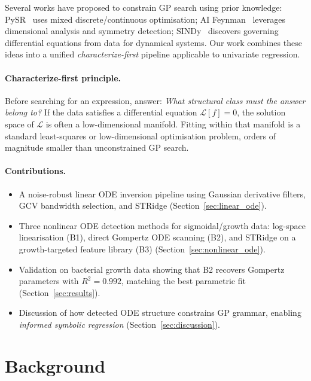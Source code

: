 \documentclass[11pt,a4paper]{article}
\begin{document}
Several works have proposed to constrain GP search using prior knowledge:
PySR~\cite{cranmer2023} uses mixed discrete/continuous optimisation;
AI Feynman~\cite{udrescu2020} leverages dimensional analysis and symmetry detection;
SINDy~\cite{brunton2016} discovers governing differential equations from data for
dynamical systems. Our work combines these ideas into a unified \emph{characterize-first}
pipeline applicable to univariate regression.

\paragraph{Characterize-first principle.}
Before searching for an expression, answer: \emph{What structural class must the answer
belong to?} If the data satisfies a differential equation $\mathcal{L}[f]=0$, the solution
space of $\mathcal{L}$ is often a low-dimensional manifold. Fitting within that manifold is
a standard least-squares or low-dimensional optimisation problem, orders of magnitude smaller
than unconstrained GP search.

\paragraph{Contributions.}
\begin{itemize}
  \item A noise-robust linear ODE inversion pipeline using Gaussian derivative filters,
        GCV bandwidth selection, and STRidge (Section~\ref{sec:linear_ode}).
  \item Three nonlinear ODE detection methods for sigmoidal/growth data:
        log-space linearisation (B1), direct Gompertz ODE scanning (B2), and
        STRidge on a growth-targeted feature library (B3) (Section~\ref{sec:nonlinear_ode}).
  \item Validation on bacterial growth data showing that B2 recovers Gompertz parameters
        with $R^2=0.992$, matching the best parametric fit (Section~\ref{sec:results}).
  \item Discussion of how detected ODE structure constrains GP grammar, enabling
        \emph{informed symbolic regression} (Section~\ref{sec:discussion}).
\end{itemize}

\section{Background}
\label{sec:background}
\end{document}
